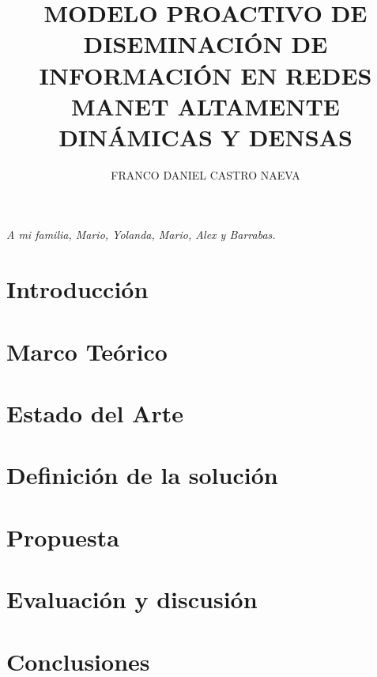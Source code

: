 \documentclass[a4paper, oneside, 11pt]{book}
\author{FRANCO DANIEL CASTRO NAEVA}
\title{MODELO PROACTIVO DE DISEMINACIÓN DE INFORMACIÓN EN REDES MANET ALTAMENTE DINÁMICAS Y DENSAS}
\begin{document}

\frontmatter
	\titlep
\pagestyle{empty}
 

\thispagestyle{empty}
%
	\newpage
	\thispagestyle{empty}
	\null
	\vspace{16cm}
	\hfill
	\textit{A mi familia, Mario, Yolanda, Mario, Alex y Barrabas.}	
	\newpage
	\thispagestyle{empty}
	\tableofcontents
	\thispagestyle{empty}
	\listoffigures
			
	
	
	\listofalgorithms
	
		\mainmatter
		\pagestyle{fancy}
	\chapter{Introducción}
	
		
	\chapter{Marco Teórico}\label{chap:marcoteorico}
	
					
	\chapter{Estado del Arte}\label{chap:estadodelarte}
	
	
	\chapter{Definición de la solución}\label{chap:contexto}
	

	\chapter{Propuesta}\label{chap:propuesta_cap}
	
	
	\chapter{Evaluación y discusión}\label{chap:discusion}
	
	
	\chapter{Conclusiones}\label{chap:conclusiones}
	
\end{document}
